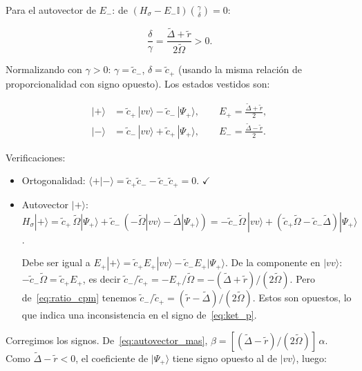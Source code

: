 \documentclass[12pt]{article}
\begin{document}
\medskip
\noindent
Para el autovector de $E_-$: de $(H_\sigma - E_-\mathbb{I})\binom{\gamma}{\delta} = 0$:

\begin{equation}
	\frac{\delta}{\gamma} = \frac{\widetilde\Delta + \tilde{r}}{2\widetilde\Omega} > 0.
\end{equation}

\noindent
Normalizando con $\gamma > 0$: $\gamma = \tilde{c}_-$,
$\delta = \tilde{c}_+$ (usando la misma relaci\'on de
proporcionalidad con signo opuesto). Los estados vestidos son:

\begin{align}
	|{+}\rangle &= \tilde{c}_+\,|vv\rangle - \tilde{c}_-\,|\Psi_+\rangle,
	\qquad E_+ = \frac{\widetilde\Delta + \tilde{r}}{2},
	\label{eq:ket_p}\\[6pt]
	|{-}\rangle &= \tilde{c}_-\,|vv\rangle + \tilde{c}_+\,|\Psi_+\rangle,
	\qquad E_- = \frac{\widetilde\Delta - \tilde{r}}{2}.
	\label{eq:ket_m}
\end{align}

\noindent
Verificaciones:
\begin{itemize}
	\item Ortogonalidad:
	$\langle+|-\rangle = \tilde{c}_+\tilde{c}_- - \tilde{c}_-\tilde{c}_+ = 0$.
	$\checkmark$
	
	\item Autovector $|+\rangle$:
	$H_\sigma|+\rangle = \tilde{c}_+\,\widetilde\Omega|\Psi_+\rangle
	+ \tilde{c}_-\,(-\widetilde\Omega|vv\rangle - \widetilde\Delta|\Psi_+\rangle)
	= -\tilde{c}_-\widetilde\Omega\,|vv\rangle
	+ (\tilde{c}_+\widetilde\Omega - \tilde{c}_-\widetilde\Delta)|\Psi_+\rangle$.
	
	Debe ser igual a $E_+|+\rangle = \tilde{c}_+E_+|vv\rangle - \tilde{c}_-E_+|\Psi_+\rangle$.
	De la componente en $|vv\rangle$: $-\tilde{c}_-\widetilde\Omega = \tilde{c}_+E_+$,
	es decir $\tilde{c}_-/\tilde{c}_+ = -E_+/\widetilde\Omega
	= -(\widetilde\Delta+\tilde{r})/(2\widetilde\Omega)$.
	Pero de~\eqref{eq:ratio_cpm} tenemos
	$\tilde{c}_-/\tilde{c}_+ = (\tilde{r}-\widetilde\Delta)/(2\widetilde\Omega)$.
	Estos son opuestos, lo que indica una inconsistencia en el signo
	de~\eqref{eq:ket_p}.
\end{itemize}

\medskip
\noindent
Corregimos los signos. De~\eqref{eq:autovector_mas},
$\beta = [(\widetilde\Delta-\tilde{r})/(2\widetilde\Omega)]\,\alpha$.
Como $\widetilde\Delta - \tilde{r} < 0$, el coeficiente de
$|\Psi_+\rangle$ tiene signo opuesto al de $|vv\rangle$, luego:
\end{document}
